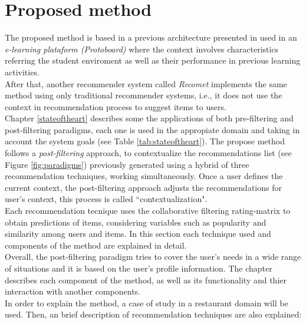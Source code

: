 \chapter{Proposed method}\label{method}

The proposed method is based  in a previous architecture presented in
  \cite{garcia2009hybrid} used in an \textit{e-learning plataform (Protoboard)}
where the context  involves characteristics referring the student
enviroment as well as their performance in previous learning activities.  \\ 
After that, another recommender system called \textit{Recomet}  
 \cite{ramirez2013restaurant} implements the same method using 
only traditional recommender systems, i.e., it does not use the context 
in recommendation process  to suggest items to users.   \\ 
Chapter  \ref{stateoftheart} describes some the applications of both pre-filtering and 
post-filtering paradigms, each one is used in the appropiate domain 
and taking in account the system goals (see Table  \ref{tab:stateoftheart}).  
The propose method follows a \textit{post-filtering} approach, 
to contextualize the recommendations list
(see Figure  \ref{fig:paradigms}) previously generated using a hybrid
of three recommendation techniques, working simultaneously.
Once a user defines the current context, the post-filtering approach
adjusts the  recommendations for user's context, this process is called
``contextualization". \\ 
Each recommendation tecnique uses the collaborative filtering rating-matrix 
to obtain  predictions of items, considering variables such as
popularity and similarity among users and items. In this section
each technique used and components of the method are explained in
detail.\\  Overall, the 
post-filtering paradigm tries to cover the  user's needs in a wide range of
situations and it is based on the user's profile information. The
chapter describes  each component of the  method, as well as its
functionality and thier interaction with  another components.\\ 
In order to explain the method, a case of study in a
restaurant   domain will be used. Then, an brief description of
recommendation  techniques are also explained: 
